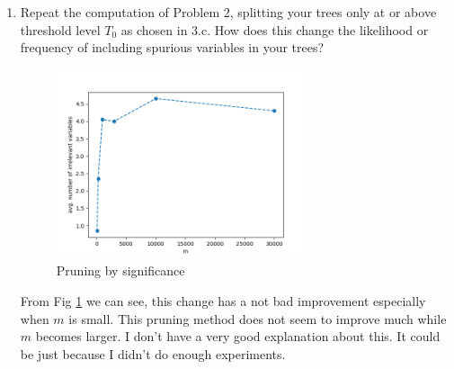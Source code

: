 \documentclass[letter, 12pt]{article}
\begin{document}
\begin{enumerate}
        \item{Repeat the computation of Problem 2, splitting your trees only at or above threshold level $T_0$ as chosen in 3.c.
        	How does this change the likelihood or frequency of including spurious variables in your trees?}
        
        \begin{figure}[H]
        	\centering
        	\includegraphics[width=0.7\textwidth]{q7-2.png}
        	\caption{Pruning by significance}
        	\label{q7}
        \end{figure}
        \par{From Fig \ref{q7} we can see, this change has a not bad improvement especially when $ m $ is small. This pruning method does not seem to improve much while $ m $ becomes larger. I don't have a very good explanation about this. It could be just because I didn't do enough experiments.}
        
    \end{enumerate}
\end{document}
